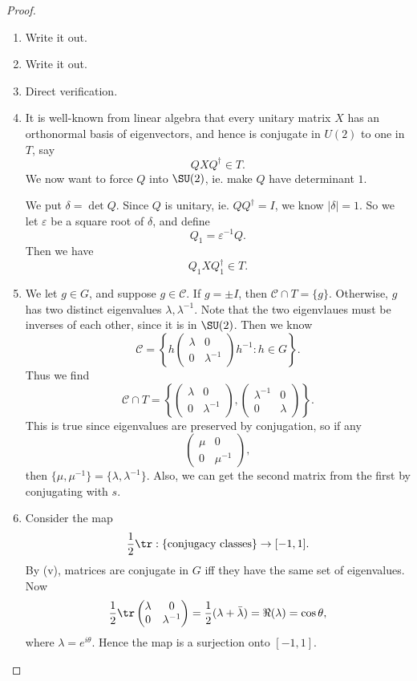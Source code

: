 \documentclass[a4paper]{article}
\begin{document}
\begin{proof}\leavevmode
  \begin{enumerate}
    \item Write it out.
    \item Write it out.
    \item Direct verification.
    \item It is well-known from linear algebra that every unitary matrix $X$ has an orthonormal basis of eigenvectors, and hence is conjugate in $U(2)$ to one in $T$, say
      \[
        Q X Q^\dagger \in T.
      \]
      We now want to force $Q$ into $\SU(2)$, ie. make $Q$ have determinant $1$.

      We put $\delta = \det Q$. Since $Q$ is unitary, ie. $QQ^\dagger = I$, we know $|\delta| = 1$. So we let $\varepsilon$ be a square root of $\delta$, and define
      \[
        Q_1 = \varepsilon^{-1} Q.
      \]
      Then we have
      \[
        Q_1 X Q_1^{\dagger} \in T.
      \]
    \item We let $g \in G$, and suppose $g \in \mathcal{C}$. If $g = \pm I$, then $\mathcal{C} \cap T = \{g\}$. Otherwise, $g$ has two distinct eigenvalues $\lambda, \lambda^{-1}$. Note that the two eigenvlaues must be inverses of each other, since it is in $\SU(2)$. Then we know
      \[
        \mathcal{C} = \left\{h
          \begin{pmatrix}
            \lambda & 0\\
            0 & \lambda^{-1}
          \end{pmatrix}h^{-1} : h \in G
        \right\}.
      \]
      Thus we find
      \[
        \mathcal{C} \cap T = \left\{
          \begin{pmatrix}
            \lambda & 0\\
            0 & \lambda^{-1}
          \end{pmatrix},
          \begin{pmatrix}
            \lambda^{-1} & 0\\
            0 & \lambda
          \end{pmatrix}
        \right\}.
      \]
      This is true since eigenvalues are preserved by conjugation, so if any
      \[
        \begin{pmatrix}
          \mu & 0\\
          0 & \mu^{-1}
        \end{pmatrix},
      \]
      then $\{\mu, \mu^{-1}\} = \{\lambda, \lambda^{-1}\}$. Also, we can get the second matrix from the first by conjugating with $s$.
    \item Consider the map
      \[
        \frac{1}{2} \tr: \{\text{conjugacy classes}\} \to [-1, 1].
      \]
      By (v), matrices are conjugate in $G$ iff they have the same set of eigenvalues. Now
      \[
        \frac{1}{2}\tr
        \begin{pmatrix}
          \lambda & 0\\
          0 & \lambda^{-1}
        \end{pmatrix}
        = \frac{1}{2}(\lambda + \bar{\lambda}) = \Re(\lambda) = \cos \theta,
      \]
      where $\lambda = e^{i\theta}$. Hence the map is a surjection onto $[-1, 1]$.


\end{enumerate}
\end{proof}
\end{document}
